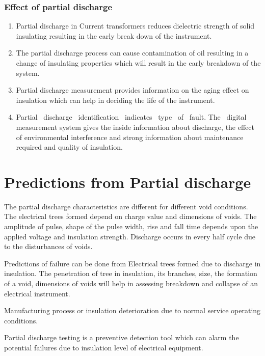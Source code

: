 \subsubsection{Effect of partial discharge}
\begin{enumerate}
\item Partial discharge in Current transformers reduces dielectric strength of solid insulating resulting in the early break down of the instrument.

\item The partial discharge process can cause contamination of oil resulting in a change of insulating properties which will result in the early breakdown of the system.

\item Partial discharge measurement provides information on the aging effect on insulation which can help in deciding the life of the instrument.

\item Partial ~discharge ~identification ~indicates ~type ~of ~fault. The ~digital measurement system gives the inside information about discharge, the effect of environmental interference and strong information about maintenance required and quality of insulation. 
\end{enumerate}


\section{Predictions from Partial  discharge }
The partial discharge characteristics are different for different void conditions. The electrical trees formed depend on charge value and dimensions of voids. The amplitude of pulse, shape of the pulse width, rise and fall time depends upon the applied voltage and insulation strength. Discharge occurs in every half cycle due to the disturbances of voids\setlength{\parskip}{1em}.


Predictions of failure can be done from Electrical trees formed due to discharge in insulation. The penetration of tree in insulation, its branches, size, the formation of a void, dimensions of voids will help in assessing breakdown and collapse of an electrical instrument. 

Manufacturing process or insulation deterioration due to normal service operating conditions.

Partial discharge testing is a preventive detection tool which can alarm the potential failures due to insulation level of electrical equipment.

